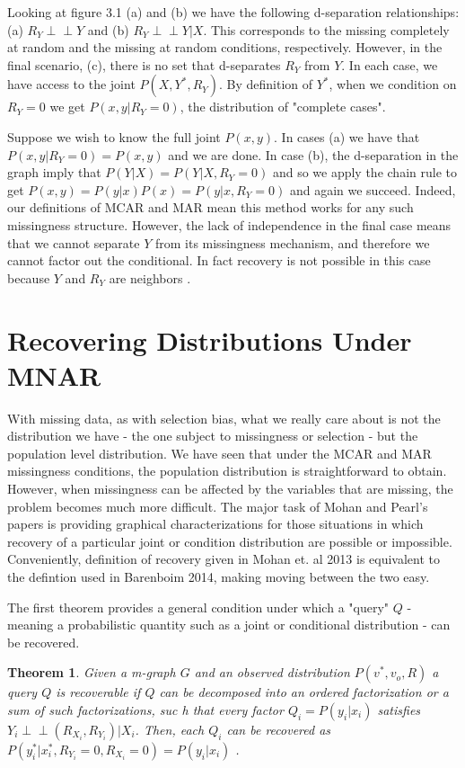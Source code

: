 \documentclass[12pt,twoside]{reedthesis}
\newtheorem{theorem}{Theorem}
\theoremstyle{definition}
\newcommand{\dsep}{\perp \!\!\!\perp}
\begin{document}
Looking at figure 3.1 (a) and (b) we have the following d-separation relationships: (a) $R_Y \dsep Y$ and (b) $R_Y \dsep Y | X$. This corresponds to the missing completely at random and the missing at random conditions, respectively. However, in the final scenario, (c), there is no set that d-separates $R_Y$ from $Y$. In each case, we have access to the joint $P(X,Y^*, R_Y)$.  By definition of $Y^*$, when we condition on $R_Y = 0$ we get $P(x,y | R_Y = 0)$, the distribution of "complete cases".

Suppose we wish to know the full joint $P(x,y)$.  In cases (a) we have that $P(x,y | R_Y = 0) = P(x,y)$ and we are done. In case (b), the d-separation in the graph imply that $P(Y|X) = P(Y| X, R_Y = 0)$ and so we apply the chain rule to get $P(x,y) = P(y|x)P(x) = P(y | x, R_Y = 0)$ and again we succeed. Indeed, our definitions of MCAR and MAR mean this method works for any such missingness structure. However, the lack of independence in the final case means that we cannot separate $Y$ from its missingness mechanism, and therefore we cannot factor out the conditional. In fact recovery is not possible in this case because $Y$ and $R_Y$ are neighbors \citep{Mohan_2013}. 

\section{Recovering Distributions Under MNAR}

With missing data, as with selection bias, what we really care about is not the distribution we have - the one subject to missingness or selection - but the population level distribution. We have seen that under the MCAR and MAR missingness conditions, the population distribution is straightforward to obtain. However, when missingness can be affected by the variables that are missing, the problem becomes much more difficult. The major task of Mohan and Pearl's papers is providing graphical characterizations for those situations in which recovery of a particular joint or condition distribution are possible or impossible. Conveniently,  definition of recovery given in Mohan et. al 2013 is equivalent to the defintion used in Barenboim 2014,  making moving between the two easy. 

The first theorem provides a general condition under which a "query" $Q$ - meaning a probabilistic quantity such as a joint or conditional distribution - can be recovered. 

\begin{theorem}
Given a m-graph $G$ and an observed distribution $P(v^*, v_o, R)$ a query $Q$ is recoverable if $Q$ can be decomposed into an ordered factorization or a sum of such factorizations, suc h that every factor $Q_i = P(y_i | x_i)$ satisfies $Y_i \dsep (R_{X_i}, R_{Y_i}) | X_i$. Then, each $Q_i$ can be recovered as $P(y^*_i | x^*_i, R_{Y_i} = 0,R_{X_i} = 0) = P(y_i | x_i)$ \citep{Mohan_2013}. 
\end{theorem}
\end{document}
